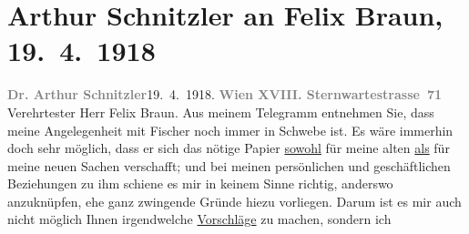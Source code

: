 

         
         \renewcommand{\erwaehntePersonen}{Personen: Felix Braun}
         \renewcommand{\erwaehnteInstitutionen}{Institutionen: Georg Müller Verlag, S. Fischer Verlag}
         \renewcommand{\erwaehnteOrte}{Orte: München, Sternwartestraße, Wien}
         \renewcommand{\erwaehnteWerke}{Werke: Casanovas Heimfahrt, Die Schwestern oder Casanova in Spa. Lustspiel in Versen, Doktor Gräsler, Badearzt, Gesammelte Werke}
               \section[Arthur Schnitzler an Felix Braun, 19. 4. 1918]{ Arthur Schnitzler an Felix Braun, 19. 4. 1918}\nopagebreak{}\rehead{ }\begin{ledgroupsized}[t]{13cm}\normalsize\beginnumbering{} \toendnotes[C]{\smallbreak\pagebreak[2]} 
\toendnotes[C]{\smallbreak}\pstart
           {\pb}\textcolor{gray}{\textbf{Dr. Arthur Schnitzler}}\hfill 19. 4. 1918.\pend
           \pstart
           \textcolor{gray}{\textbf{Wien XVIII. Sternwartestrasse 71}}\pend
           \pstart\center{}Verehrtester Herr Felix Braun.\pend\pstart
           Aus meinem Telegramm entnehmen Sie, dass meine Angelegenheit mit Fischer noch immer in Schwebe ist. Es wäre immerhin doch sehr
               möglich, dass er sich das nötige Papier \uline{sowohl} für
               meine alten \uline{als} für meine neuen Sachen verschafft;
               und bei meinen persönlichen und geschäftlichen Beziehungen zu ihm schiene es mir in
               keinem Sinne richtig, anderswo anzuknüpfen, ehe ganz zwingende Gründe hiezu
               vorliegen. Darum ist es mir auch nicht möglich Ihnen \introOben{}irgend\introOben{}welche \uline{Vorschläge} zu machen, sondern ich

\end{ledgroupsized}
